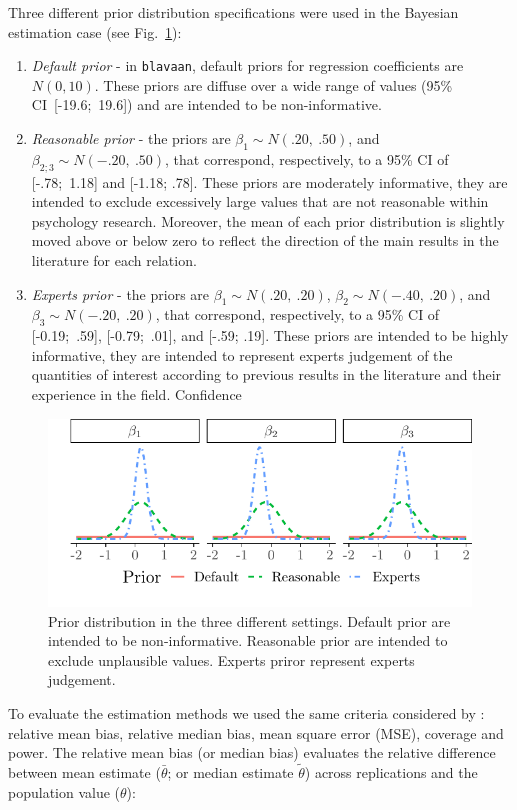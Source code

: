 \documentclass[graybox]{svmult}
\begin{document}
Three different prior distribution specifications were used in the Bayesian estimation case (see Fig.~\ref{fig:prior}):

\begin{enumerate}
	\item{\textit{Default prior} -  in \texttt{blavaan}, default priors for regression coefficients are $N(0,10)$}. These priors are diffuse over a wide range of values (95\% CI\ [-19.6;\ 19.6]) and are intended to be non-informative.
	\item{\textit{Reasonable prior} - the priors are $\beta_1\sim N(.20,\ .50)$, and  $\beta_{2;3}\sim N(-.20,\ .50)$, that correspond, respectively, to a 95\% CI of  [-.78;\ 1.18] and  [-1.18; .78]. These priors are moderately informative, they are intended to exclude excessively large values that are not reasonable within psychology research. Moreover, the mean of each prior distribution is slightly moved above or below zero to reflect the direction of the main results in the literature for each relation.}
 	\item{\textit{Experts prior} - the priors are $\beta_1\sim N(.20,\ .20)$,  $\beta_{2}\sim N(-.40,\ .20)$}, and $\beta_3\sim N(-.20,\ .20)$, that correspond, respectively, to a 95\% CI of  [-0.19;\ .59], [-0.79;\ .01], and  [-.59; .19]. These priors are intended to be highly informative, they are intended to represent experts judgement of the quantities of interest according to previous results in the literature and their experience in the field. Confidence 
\end{enumerate}

\begin{figure}[b]
	\sidecaption
	\includegraphics[width = .64\textwidth]{figure/Plot_prior}
	\caption{Prior distribution in the three different settings. Default prior are intended to be non-informative. Reasonable prior  are intended to exclude unplausible values. Experts priror represent experts judgement.}
	\label{fig:prior}
\end{figure}

To evaluate the estimation methods we used the same criteria considered by \cite{smidSemSmallSamples2020}: relative mean bias, relative median bias, mean square error (MSE), coverage and power. The relative mean bias (or median bias) evaluates the relative difference between mean estimate ($\bar{\theta}$; or median estimate $\widetilde{\theta}$) across replications and the population value ($\theta$):
\end{document}
